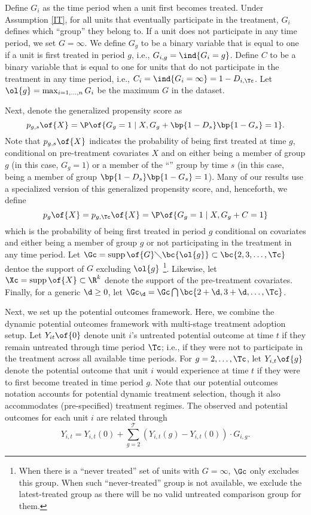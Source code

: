 \documentclass[12pt]{article}
\newcommand{\highlightB}[1]{{\emph{\color{MyBlue}{#1}}}}
\theoremstyle{definition}
\begin{document}
Define $G_i$ as the time period when a unit first becomes treated. Under Assumption \ref{IT}, for all units that eventually participate in the treatment, $G_i$ defines which ``group'' they belong to. If a unit does not participate in any time period, we set $G = \infty$. We define $G_g$ to be a binary variable that is equal to one if a unit is first treated in period $g$, i.e., $G_{i,g} = \ind{G_i = g}$. Define $C$ to be a binary variable that is equal to one for units that do not participate in the treatment in any time period, i.e., $C_i = \ind{G_i = \infty} = 1 - D_{i, \Tc}$. Let $\ol{g} = \max_{i=1,\ldots,n}G_i$ be the maximum $G$ in the dataset. 

Next, denote the generalized propensity score as 
$$
p_{g,s}\of{X} = \P\of{G_g = 1 \mid X, G_g + \bp{1 - D_s}\bp{1 - G_s} = 1}.
$$
Note that $p_{g,s}\of{X}$ indicates the probability of being first treated at time $g$, conditional on pre-treatment covariates $X$ and on either being a member of group $g$ (in this case, $G_g = 1$) or a member of the ``\highlightB{not-yet-treated}'' group by time $s$ (in this case, being a member of group $\bp{1 - D_s}\bp{1 - G_s} = 1$). Many of our results use a specialized version of this generalized propensity score, and, henceforth, we define 
$$
p_{g}\of{X} = p_{g, \Tc}\of{X} = \P\of{G_g = 1 \mid X, G_g + C = 1}
$$
which is the probability of being first treated in period $g$ conditional on covariates and either being a member of group $g$ or not participating in the treatment in any time period. Let $\Gc = \operatorname*{supp}\of{G} \diagdown \bc{\ol{g}} \subset \bc{2, 3, \ldots, \Tc}$ dentoe the support of $G$ excluding $\ol{g}$ \footnote{When there is a ``never treated'' set of units with $G = \infty$, $\Gc$ only excludes this group. When such ``never-treated'' group is not available, we exclude the latest-treated group as there will be no valid untreated comparison group for them.}. Likewise, let $\Xc = \operatorname*{supp}\of{X} \subset \R^k$ denote the support of the pre-treatment covariates. Finally, for a generic $\d \geq 0$, let $\Gc_\d = \Gc \bigcap \bc{2 + \d, 3 + \d, \ldots, \Tc}$.

Next, we set up the potential outcomes framework. Here, we combine the dynamic potential outcomes framework with multi-stage treatment adoption setup. Let $Y_{it}\of{0}$ denote unit $i$'s untreated potential outcome at time $t$ if they remain untreated through time period $\Tc$; i.e., if they were not to participate in the treatment across all available time periods. For $g = 2, \ldots, \Tc$, let $Y_{i,t}\of{g}$ denote the potential outcome that unit $i$ would experience at time $t$ if they were to first become treated in time period $g$. Note that our potential outcomes notation accounts for potential dynamic treatment selection, though it also accommodates (pre-specified) treatment regimes. The observed and potential outcomes for each unit $i$ are related through 
\begin{equation}
    \label{2_1}
    Y_{i, t}=Y_{i, t}(0)+\sum_{g=2}^{\mathcal{T}}\left(Y_{i, t}(g)-Y_{i, t}(0)\right) \cdot G_{i, g}.
\end{equation}
\end{document}
